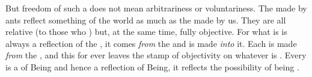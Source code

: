 But freedom of such a  does not mean
arbitrariness or voluntariness. The
 made by ants reflect something of the world as much as the
 made by us. They are all relative (to those who )
but, at the same time, fully objective.
 For what is  is always a reflection
of the , it comes {\em from} the  and is made {\em
  into} it.  Each  is made {\em from} the ,
and this  for ever leaves the stamp of objectivity on whatever is
.
Every  is a  of Being and hence a reflection of Being,
it reflects the possibility of being . 


